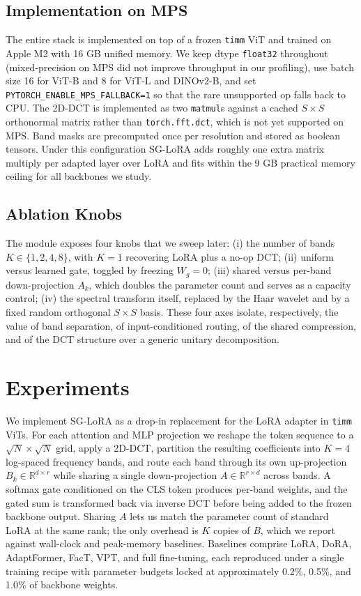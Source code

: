 \documentclass{article}
\begin{document}
\subsection{Implementation on MPS}

The entire stack is implemented on top of a frozen \texttt{timm} ViT and trained on Apple M2 with 16 GB unified memory. We keep dtype \texttt{float32} throughout (mixed-precision on MPS did not improve throughput in our profiling), use batch size 16 for ViT-B and 8 for ViT-L and DINOv2-B, and set \texttt{PYTORCH\_ENABLE\_MPS\_FALLBACK=1} so that the rare unsupported op falls back to CPU. The 2D-DCT is implemented as two \texttt{matmul}s against a cached $S \times S$ orthonormal matrix rather than \texttt{torch.fft.dct}, which is not yet supported on MPS. Band masks are precomputed once per resolution and stored as boolean tensors. Under this configuration SG-LoRA adds roughly one extra matrix multiply per adapted layer over LoRA and fits within the 9 GB practical memory ceiling for all backbones we study.

\subsection{Ablation Knobs}

The module exposes four knobs that we sweep later: (i) the number of bands $K \in \{1, 2, 4, 8\}$, with $K=1$ recovering LoRA plus a no-op DCT; (ii) uniform versus learned gate, toggled by freezing $W_g = 0$; (iii) shared versus per-band down-projection $A_k$, which doubles the parameter count and serves as a capacity control; (iv) the spectral transform itself, replaced by the Haar wavelet and by a fixed random orthogonal $S \times S$ basis. These four axes isolate, respectively, the value of band separation, of input-conditioned routing, of the shared compression, and of the DCT structure over a generic unitary decomposition.

\section{Experiments}
We implement SG-LoRA as a drop-in replacement for the LoRA adapter in \texttt{timm} ViTs. For each attention and MLP projection we reshape the token sequence to a $\sqrt{N}\times\sqrt{N}$ grid, apply a 2D-DCT, partition the resulting coefficients into $K{=}4$ log-spaced frequency bands, and route each band through its own up-projection $B_k\in\mathbb{R}^{d\times r}$ while sharing a single down-projection $A\in\mathbb{R}^{r\times d}$ across bands. A softmax gate conditioned on the CLS token produces per-band weights, and the gated sum is transformed back via inverse DCT before being added to the frozen backbone output. Sharing $A$ lets us match the parameter count of standard LoRA at the same rank; the only overhead is $K$ copies of $B$, which we report against wall-clock and peak-memory baselines. Baselines comprise LoRA, DoRA, AdaptFormer, FacT, VPT, and full fine-tuning, each reproduced under a single training recipe with parameter budgets locked at approximately 0.2\%, 0.5\%, and 1.0\% of backbone weights.
\end{document}
